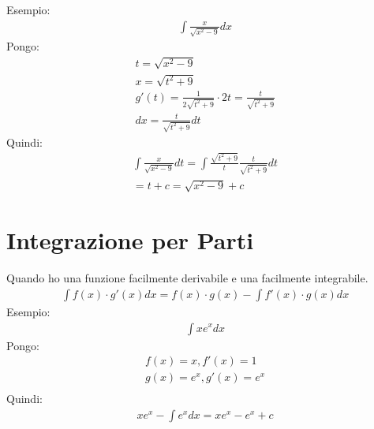 \documentclass{article}
\begin{document}
Esempio:
\begin{gather*}
		\int \frac{x}{\sqrt{x^2 - 9}}dx
\end{gather*}
Pongo:
\begin{gather*}
		t=\sqrt{x^2 - 9}\\
		x = \sqrt{t^2 + 9}\\
		g'(t) = \frac{1}{2\sqrt{t^2 + 9}}\cdot 2t =\frac{t}{\sqrt{t^2+9}}\\
		dx=\frac{t}{\sqrt{t^2+9}}dt
\end{gather*}
Quindi:
\begin{gather*}
		\int \frac{x}{\sqrt{x^2-9}}dt=\int \frac{\sqrt{t^2+9}}{t}\frac{t}{\sqrt{t^2+9}}dt\\
		= t +c =\sqrt{x^2-9}+c
\end{gather*}
\section{Integrazione per Parti}
Quando ho una funzione facilmente derivabile e una facilmente integrabile.
\begin{gather*}
		\int f(x)\cdot g'(x)dx = f(x)\cdot g(x) - \int f'(x)\cdot g(x)dx
\end{gather*}
Esempio:
\begin{gather*}
		\int xe^x dx		
\end{gather*}
Pongo:
\begin{gather*}
		f(x) = x, f'(x) = 1\\
		g(x) = e^x, g'(x) = e^x\\
\end{gather*}
Quindi:
\begin{gather*}
		xe^x - \int e^x dx = xe^x - e^x + c
\end{gather*}
\end{document}
